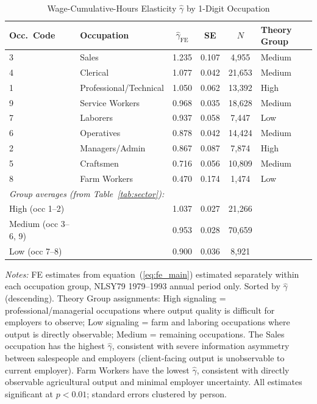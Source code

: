 \documentclass[12pt]{article}
\theoremstyle{definition}
\theoremstyle{remark}
\begin{document}
\begin{table}[htbp]
\centering
\caption{Wage-Cumulative-Hours Elasticity $\hat{\gamma}$ by 1-Digit Occupation}
\label{tab:gamma_occ}
\begin{threeparttable}
\small
\setlength{\tabcolsep}{6pt}
\begin{tabular}{llcccl}
\toprule
Occ.\ Code & Occupation & $\hat{\gamma}_{\text{FE}}$ & SE & $N$ & Theory Group \\
\midrule
3 & Sales                   & 1.235 & 0.107 &  4,955 & Medium \\
4 & Clerical                & 1.077 & 0.042 & 21,653 & Medium \\
1 & Professional/Technical  & 1.050 & 0.062 & 13,392 & High   \\
9 & Service Workers         & 0.968 & 0.035 & 18,628 & Medium \\
7 & Laborers                & 0.937 & 0.058 &  7,447 & Low    \\
6 & Operatives              & 0.878 & 0.042 & 14,424 & Medium \\
2 & Managers/Admin          & 0.867 & 0.087 &  7,874 & High   \\
5 & Craftsmen               & 0.716 & 0.056 & 10,809 & Medium \\
8 & Farm Workers            & 0.470 & 0.174 &  1,474 & Low    \\
\midrule
\multicolumn{3}{l}{\textit{Group averages (from Table~\ref{tab:sector}):}} \\
\quad High (occ 1--2) & & 1.037 & 0.027 & 21,266 & \\
\quad Medium (occ 3--6, 9) & & 0.953 & 0.028 & 70,659 & \\
\quad Low (occ 7--8) & & 0.900 & 0.036 &  8,921 & \\
\bottomrule
\end{tabular}
\begin{tablenotes}
\small
\item \textit{Notes:} FE estimates from equation~(\ref{eq:fe_main}) estimated separately
within each occupation group, NLSY79 1979--1993 annual period only. Sorted by $\hat{\gamma}$
(descending). Theory Group assignments: High signaling = professional/managerial occupations
where output quality is difficult for employers to observe; Low signaling = farm and
laboring occupations where output is directly observable; Medium = remaining occupations.
The Sales occupation has the highest $\hat{\gamma}$, consistent with severe information
asymmetry between salespeople and employers (client-facing output is unobservable to
current employer). Farm Workers have the lowest $\hat{\gamma}$, consistent with directly
observable agricultural output and minimal employer uncertainty. All estimates significant
at $p < 0.01$; standard errors clustered by person.
\end{tablenotes}
\end{threeparttable}
\end{table}
\end{document}
